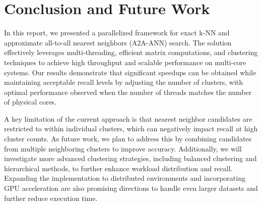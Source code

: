 \documentclass[conference]{IEEEtran}
\begin{document}
\section{Conclusion and Future Work}

In this report, we presented a parallelized framework for exact k-NN and approximate all-to-all nearest 
neighbors (A2A-ANN) search. The solution effectively leverages multi-threading, efficient matrix computations, 
and clustering techniques to achieve high throughput and scalable performance on multi-core systems. Our results 
demonstrate that significant speedups can be obtained while maintaining acceptable recall levels by adjusting the 
number of clusters, with optimal performance observed when the number of threads matches the number of physical 
cores.

A key limitation of the current approach is that nearest neighbor candidates are restricted to within individual 
clusters, which can negatively impact recall at high cluster counts. As future work, we plan to address this by 
combining candidates from multiple neighboring clusters to improve accuracy. Additionally, we will investigate 
more advanced clustering strategies, including balanced clustering and hierarchical methods, to further enhance 
workload distribution and recall. Expanding the implementation to distributed environments and incorporating GPU
acceleration are also promising directions to handle even larger datasets and further reduce execution time.



\end{document}
